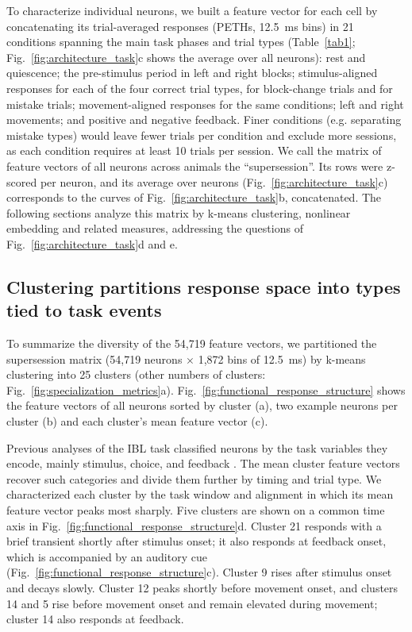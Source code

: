 \documentclass[10pt,lineno]{elife}
\begin{document}
To characterize individual neurons, we built a feature vector for each cell by concatenating its trial-averaged responses (PETHs, 12.5~ms bins) in 21 conditions spanning the main task phases and trial types (Table~\ref{tab1}; Fig.~\ref{fig:architecture_task}c shows the average over all neurons): rest and quiescence; the pre-stimulus period in left and right blocks; stimulus-aligned responses for each of the four correct trial types, for block-change trials and for mistake trials; movement-aligned responses for the same conditions; left and right movements; and positive and negative feedback. Finer conditions (e.g. separating mistake types) would leave fewer trials per condition and exclude more sessions, as each condition requires at least 10 trials per session. We call the matrix of feature vectors of all neurons across animals the ``supersession''. Its rows were z-scored per neuron, and its average over neurons (Fig.~\ref{fig:architecture_task}c) corresponds to the curves of Fig.~\ref{fig:architecture_task}b, concatenated. The following sections analyze this matrix by k-means clustering, nonlinear embedding and related measures, addressing the questions of Fig.~\ref{fig:architecture_task}d and e.

\subsection{Clustering partitions response space into types tied to task events}

To summarize the diversity of the 54,719 feature vectors, we partitioned the supersession matrix (54,719 neurons $\times$ 1,872 bins of 12.5~ms) by k-means clustering into 25 clusters (other numbers of clusters: Fig.~\ref{fig:specialization_metrics}a). Fig.~\ref{fig:functional_response_structure} shows the feature vectors of all neurons sorted by cluster (a), two example neurons per cluster (b) and each cluster's mean feature vector (c).

Previous analyses of the IBL task classified neurons by the task variables they encode, mainly stimulus, choice, and feedback \cite{international2025brain}. The mean cluster feature vectors recover such categories and divide them further by timing and trial type. We characterized each cluster by the task window and alignment in which its mean feature vector peaks most sharply. Five clusters are shown on a common time axis in Fig.~\ref{fig:functional_response_structure}d. Cluster 21 responds with a brief transient shortly after stimulus onset; it also responds at feedback onset, which is accompanied by an auditory cue (Fig.~\ref{fig:functional_response_structure}c). Cluster 9 rises after stimulus onset and decays slowly. Cluster 12 peaks shortly before movement onset, and clusters 14 and 5 rise before movement onset and remain elevated during movement; cluster 14 also responds at feedback.
\end{document}
